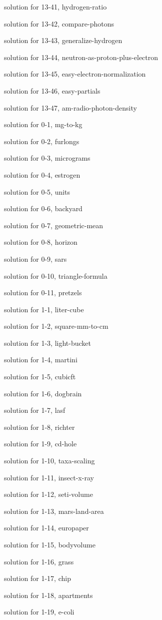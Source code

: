 \documentclass{problems}
\begin{document}
solution for 13-41, hydrogen-ratio

solution for 13-42, compare-photons

solution for 13-43, generalize-hydrogen

solution for 13-44, neutron-as-proton-plus-electron

solution for 13-45, easy-electron-normalization

solution for 13-46, easy-partials

solution for 13-47, am-radio-photon-density

solution for 0-1, mg-to-kg

solution for 0-2, furlongs

solution for 0-3, micrograms

solution for 0-4, estrogen

solution for 0-5, units

solution for 0-6, backyard

solution for 0-7, geometric-mean

solution for 0-8, horizon

solution for 0-9, sars

solution for 0-10, triangle-formula

solution for 0-11, pretzels

solution for 1-1, liter-cube

solution for 1-2, square-mm-to-cm

solution for 1-3, light-bucket

solution for 1-4, martini

solution for 1-5, cubicft

solution for 1-6, dogbrain

solution for 1-7, lasf

solution for 1-8, richter

solution for 1-9, cd-hole

solution for 1-10, taxa-scaling

solution for 1-11, insect-x-ray

solution for 1-12, seti-volume

solution for 1-13, mars-land-area

solution for 1-14, europaper

solution for 1-15, bodyvolume

solution for 1-16, grass

solution for 1-17, chip

solution for 1-18, apartments

solution for 1-19, e-coli
\end{document}
